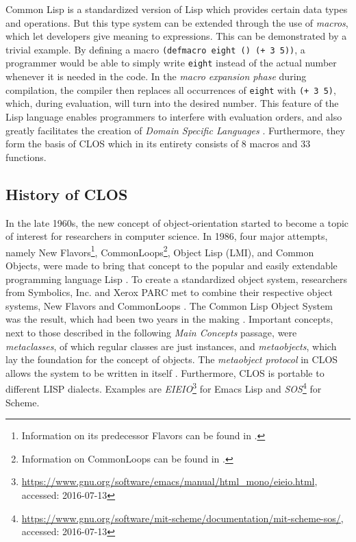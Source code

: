 \documentclass[oribibl]{llncs}
\begin{document}
Common Lisp is a standardized version of Lisp which provides certain data types and operations. But this type system can be extended through the use of \emph{macros}, which let developers give meaning to expressions. This can be demonstrated by a trivial example. By defining a macro \texttt{(defmacro eight () (+ 3 5))}, a programmer would be able to simply write \texttt{eight} instead of the actual number whenever it is needed in the code. In the \emph{macro expansion phase} during compilation, the compiler then replaces all occurrences of \texttt{eight} with \texttt{(+ 3 5)}, which, during evaluation, will turn into the desired number. This feature of the Lisp language enables programmers to interfere with evaluation orders, and also greatly facilitates the creation of \emph{Domain Specific Languages} \cite{fowler2011domain-specific}. Furthermore, they form the basis of CLOS which in its entirety consists of 8 macros and 33 functions.



\subsection{History of CLOS}
\label{sec:history}

In the late 1960s, the new concept of object-orientation started to become a topic of interest for researchers in computer science. In 1986, four major attempts, namely New Flavors\footnote{Information on its predecessor Flavors can be found in \cite{Moon:1986:OPF:28697.28698}.}, CommonLoops\footnote{Information on CommonLoops can be found in \cite{Bobrow:1986:CML:28697.28700}.}, Object Lisp (LMI), and Common Objects, were made to bring that concept to the popular and easily extendable programming language Lisp \cite{steele1993evolution}. To create a standardized object system, researchers from Symbolics, Inc. and Xerox PARC met to combine their respective object systems, New Flavors and CommonLoops \cite{demichiel1987common}. The Common Lisp Object System was the result, which had been two years in the making \cite{steele1993evolution}. Important concepts, next to those described in the following \emph{Main Concepts} passage, were \emph{metaclasses}, of which regular classes are just instances, and \emph{metaobjects}, which lay the foundation for the concept of objects\cite{kiczales1991art}. The \emph{metaobject protocol} in CLOS allows the system to be written in itself \cite{steele1993evolution}. Furthermore, CLOS is portable to different LISP dialects. Examples are \emph{EIEIO}\footnote{\url{https://www.gnu.org/software/emacs/manual/html_mono/eieio.html}, accessed: 2016-07-13} for Emacs Lisp and \emph{SOS}\footnote{\url{https://www.gnu.org/software/mit-scheme/documentation/mit-scheme-sos/}, accessed: 2016-07-13} for Scheme.
\end{document}
